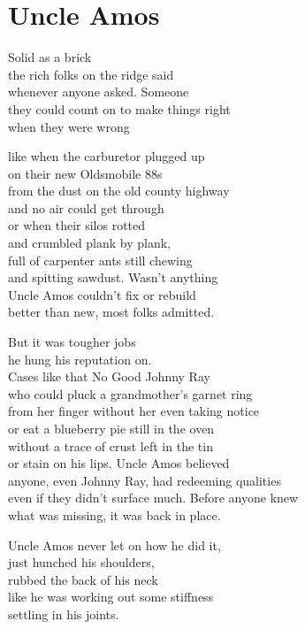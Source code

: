 \documentclass[twoside,10pt]{book}
\begin{document}
\clearpage
\section{Uncle Amos}

Solid as a brick\\
the rich folks on the ridge said\\
whenever anyone asked. Someone\\
they could count on to make things right\\
when they were wrong

like when the carburetor plugged up\\
on their new Oldsmobile 88s\\
from the dust on the old county highway\\
and no air could get through\\
or when their silos rotted\\
and crumbled plank by plank,\\
full of carpenter ants still chewing\\
and spitting sawdust. Wasn't anything\\
Uncle Amos couldn't fix or rebuild\\
better than new, most folks admitted.

But it was tougher jobs\\
he hung his reputation on.\\
Cases like that No Good Johnny Ray\\
who could pluck a grandmother's garnet ring\\
from her finger without her even taking notice\\
or eat a blueberry pie still in the oven\\
without a trace of crust left in the tin\\
or stain on his lips. Uncle Amos believed\\
anyone, even Johnny Ray, had redeeming qualities\\
even if they didn't surface much. Before anyone knew\\
what was missing, it was back in place.

Uncle Amos never let on how he did it,\\
just hunched his shoulders,\\
rubbed the back of his neck\\
like he was working out some stiffness\\
settling in his joints.
\end{document}
